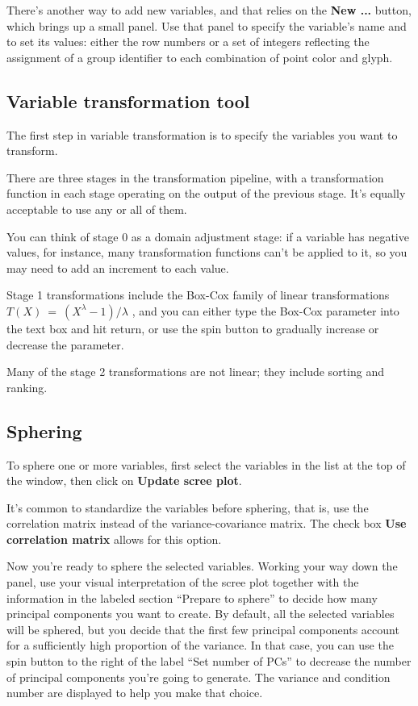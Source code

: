 \documentclass[11pt]{article}
\def\Widget#1{\textbf{#1}}
\begin{document}
\label{NewVariable}
There's another way to add new variables, and that relies on the
\Widget{New ...} button, which brings up a small panel.  Use that
panel to specify the variable's name and to set its values: either the
row numbers or a set of integers reflecting the assignment of a group
identifier to each combination of point color and glyph.

\subsection{Variable transformation tool}
\label{slbl:VarTransform}

The first step in variable transformation is to specify the variables
you want to transform.

There are three stages in the transformation pipeline, with a
transformation function in each stage operating on the output of the
previous stage.  It's equally acceptable to use any or all of them.

You can think of stage 0 as a domain adjustment stage:  if a variable
has negative values, for instance, many transformation functions
can't be applied to it, so you may need to add an increment to each
value.

Stage 1 transformations include the Box-Cox family of linear
transformations \( T(X)~=~(X ^ \lambda - 1) / \lambda\) \cite{BoxCox64},
and you can either type the Box-Cox parameter into
the text box and hit return, or use the spin button to gradually
increase or decrease the parameter. 

Many of the stage 2
transformations are not linear; they include sorting and ranking.

\subsection{Sphering}
\label{slbl:Sphering}

To sphere one or more variables, first select the variables in the list
at the top of the window, then click on \Widget{Update scree plot}.

It's common to standardize the variables before sphering, that is, use
the correlation matrix instead of the variance-covariance matrix. The
check box \Widget{Use correlation matrix} allows for this option.

Now you're ready to sphere the selected variables.  Working your way down
the panel, use your visual interpretation of the scree plot together
with the information in the labeled section ``Prepare to sphere'' to
decide how many principal components you want to create.  By default,
all the selected variables will be sphered, but you decide that the first
few principal components account for a sufficiently high proportion of
the variance.  In that case, you can use the spin button to the right
of the label ``Set number of PCs'' to decrease the number of principal
components you're going to generate.  The variance and condition number
are displayed to help you make that choice.
\end{document}
